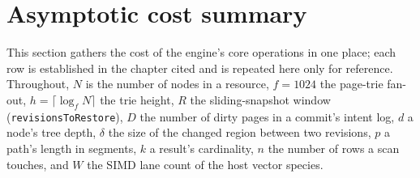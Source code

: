 \documentclass[11pt,a4paper,oneside]{report}
\theoremstyle{sirixthm}
\newcommand{\code}[1]{\texttt{#1}}
\begin{document}
\section{Asymptotic cost summary}
\label{app:costs}

This section gathers the cost of the engine's core operations in one place; each row is established in
the chapter cited and is repeated here only for reference. Throughout, $N$ is the number of nodes in a
resource, $f=1024$ the page-trie fan-out, $h=\lceil\log_f N\rceil$ the trie height, $R$ the
sliding-snapshot window (\code{revisionsToRestore}), $D$ the number of dirty pages in a commit's intent log,
$d$ a node's tree depth, $\delta$ the size of the changed region between two revisions, $p$ a path's
length in segments, $k$ a result's cardinality, $n$ the number of rows a scan touches, and $W$ the SIMD
lane count of the host vector species.
\end{document}
